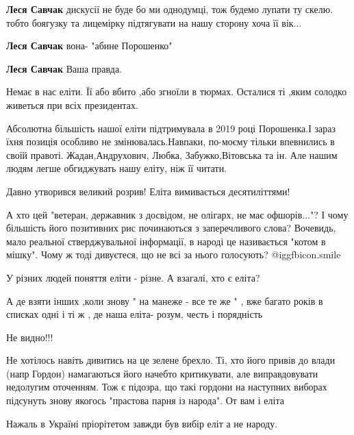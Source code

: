\begin{itemize}
\begin{itemize}
\textbf{Леся Савчак} дискусії не буде бо ми однодумці, тож будемо лупати ту скелю. тобто боягузку та лицемірку підтягувати на нашу сторону хоча її вік...

\textbf{Леся Савчак} вона- "абине Порошенко"

\textbf{Леся Савчак} Ваша правда.
\end{itemize} %

Немає в нас еліти. Її або вбито ,або згноїли в тюрмах. Осталися ті ,яким солодко живеться при всіх президентах.


Абсолютна більшість нашої еліти підтримувала в 2019 році Порошенка.І зараз їхня
позиція особливо не змінювалась.Навпаки, по-моєму тільки впевнились в своїй
правоті. Жадан,Андрухович, Любка, Забужко,Вітовська та ін. Але нашим людям
легше обгиджувать нашу еліту, ніж її читати.


Давно утворився великий розрив! Еліта вимивається десятиліттями!


А хто цей "ветеран, державник з досвідом, не олігарх, не має офшорів..."? І
чому більшість його позитивних рис починаються з заперечливого слова? Вочевидь,
мало реальної стверджувальної інформації, в народі це називається "котом в
мішку". Чому ж тоді дивуєтеся, що не всі за нього голосують?  @igg{fbicon.smile} 

У різних людей поняття еліти - різне. А взагалі, хто є еліта?


А де взяти інших ,коли знову " на манеже - все те же " , вже багато років в
списках одні і ті ж , де наша еліта- розум, честь і порядність

Не видно!!!


Не хотілось навіть дивитись на це зелене брехло. Ті, хто його привів до влади
(напр Гордон) намагаються його начебто критикувати, але виправдовувати
недолугим оточенням. Тож є підозра, що такі гордони на наступних виборах
підсунуть знову якогось "прастова парня із народа". От вам і еліта



Нажаль в Україні пріорітетом завжди був вибір еліт а не народу.


\end{itemize}
